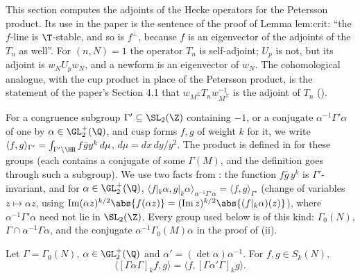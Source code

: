 This section computes the adjoints of the Hecke operators for the Petersson product. Its use in the paper is the sentence of the proof of Lemma lem:crit: ``the
$f$-line is $\T$-stable, and so is $f^\perp$, because $f$ is an eigenvector of the adjoints of the $T_n$ as well''. For $(n,N)=1$ the operator $T_n$ is self-adjoint; $U_p$ is not,
but its adjoint is $w_NU_pw_N$, and a newform is an eigenvector of $w_N$. The cohomological analogue, with the cup product in place of the Petersson product, is the
statement of the paper's Section 4.1 that $w_{M^\Sigma}T_nw_{M^\Sigma}^{-1}$ is the adjoint of $T_n$ ().

For a congruence subgroup $\Gamma'\subseteq\SL_2(\Z)$ containing $-1$, or a conjugate $\alpha^{-1}\Gamma'\alpha$ of one by $\alpha\in\GL_2^+(\Q)$, and cusp forms $f,g$ of weight $k$ for it, we write $\langle f,g\rangle_{\Gamma'}=\int_{\Gamma'\backslash\HH}f\bar gy^k\,d\mu$, $d\mu=dx\,dy/y^2$. The product is defined in  for these groups (each contains a conjugate of some $\Gamma(M)$, and the definition goes through such a subgroup). We
use two facts from : the function $f\bar g\,y^k$ is $\Gamma'$-invariant, and for $\alpha\in\GL_2^+(\Q)$, $\langle f|_k\alpha,g|_k\alpha\rangle_{\alpha^{-1}\Gamma'\alpha}=\langle f,g\rangle_{\Gamma'}$ (change of
variables $z\mapsto\alpha z$, using $\operatorname{Im}(\alpha z)^{k/2}\abs{f(\alpha z)}=(\operatorname{Im}z)^{k/2}\abs{(f|_k\alpha)(z)}$), where $\alpha^{-1}\Gamma'\alpha$ need not lie in $\SL_2(\Z)$. Every group used below is of this kind: $\Gamma_0(N)$, $\Gamma\cap\alpha^{-1}\Gamma\alpha$, and the conjugate $\alpha^{-1}\Gamma_0(M)\alpha$ in the proof of (ii).

\begin{proposition}\label{prop:hecke:double-coset-adjoint}
Let $\Gamma=\Gamma_0(N)$, $\alpha\in\GL_2^+(\Q)$ and $\alpha'=(\det\alpha)\alpha^{-1}$. For $f,g\in S_k(N)$,
\[
\langle[\Gamma\alpha\Gamma]_kf,g\rangle=\langle f,[\Gamma\alpha'\Gamma]_kg\rangle.
\]
\end{proposition}

